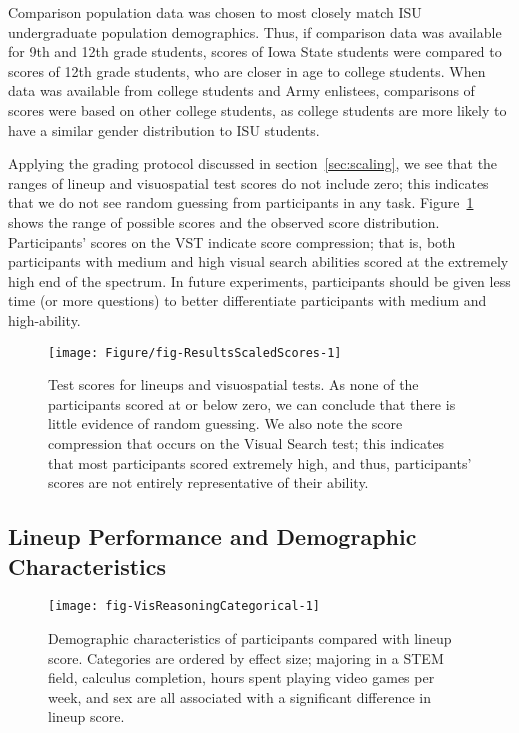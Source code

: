\documentclass[journal]{vgtc}\usepackage[]{graphicx}\usepackage[]{color}
\begin{document}
Comparison population data was chosen to most closely match ISU undergraduate population demographics. Thus, if comparison data was available for 9th and 12th grade students, scores of Iowa State students were compared to scores of 12th grade students, who are closer in age to college students. When data was available from college students and Army enlistees, comparisons of scores were based on other college students, as college students are more likely to have a similar gender distribution to ISU students.

Applying the grading protocol discussed in section~\ref{sec:scaling}, we see that the ranges of lineup and visuospatial test scores do not include zero; this indicates that we do not see random guessing from participants in any task. Figure~\ref{fig:Scores} shows the range of possible scores and the observed score distribution. 
Participants' scores on the VST indicate score compression; that is, both participants with medium and high visual search abilities scored at the extremely high end of the spectrum. 
In future experiments, participants should be given less time (or more questions) to better differentiate participants with medium and high-ability.


\begin{figure}[ht]
\texttt{[image: Figure/fig-ResultsScaledScores-1]}
\caption{Test scores for lineups and visuospatial tests. As none of the participants scored at or below zero, we can conclude that there is little evidence of random guessing. We also note the score compression that occurs on the Visual Search test; this indicates that most participants scored extremely high, and thus, participants' scores are not entirely representative of their ability. \label{fig:Scores}}
\end{figure}
% 
\afterpage{\clearpage}



\subsection{Lineup Performance and Demographic Characteristics}


\begin{figure*}[h!tb]\centering
\texttt{[image: fig-VisReasoningCategorical-1]}
\caption[Visual Aptitude Study Results]{Demographic characteristics of participants compared with lineup score. Categories are ordered by effect size; majoring in a STEM field, calculus completion, hours spent playing video games per week, and sex are all associated with a significant difference in lineup score. }\label{fig:visualaptitudecat}
\end{figure*}
\afterpage{\clearpage}
\end{document}
